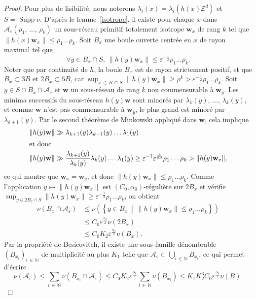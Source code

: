 \documentclass[AHL,Unicode,longabstracts,francais,published]{cedram}
\DeclareMathOperator{\Supp}{Supp}
\newcommand{\norm}[1]{\lVert#1\rVert}
\newcommand{\Z}{\mathbb{Z}}
\newcommand{\N}{\mathbb{N}}
\newcommand{\bw}{\mathbf{w}}
\newcommand{\cA}{\mathcal{A}}
\newcommand{\eps}{\varepsilon}
\let\oldforall\forall
\renewcommand*{\forall}{\mathrel{\oldforall}}
\begin{document}
\begin{proof}
Pour plus de lisibilité, nous noterons $\lambda_i(x)=\lambda_i(h(x)\Z^d)$ et $S=\Supp\nu$. D'après le lemme~\ref{isotrope}, il existe pour chaque $x$ dans $\cA_\eps(\rho_1,\,\dots,\,\rho_k)$ un sous-réseau primitif totalement isotrope $\bw_x$ de rang $k$ tel que $\|h(x)\bw_x\|\leq\rho_1\dots\rho_k$. Soit $B_x$ une boule ouverte centrée en $x$ de rayon maximal tel que
\[
\forall y\in B_x\cap S,\ \left\|h(y)\bw_x\right\| \leq \eps^{-\frac{1}{2}}\rho_1\dots\rho_k.
\]
Noter que par continuité de $h$, la boule $B_x$ est de rayon strictement positif, et que $B_x\subset 3B$ et $2B_x\subset 5B$, car $\sup_{x\,\in\,B\,\cap\,S}\|h(y)\bw_x\|\geq\rho^k>\eps^{-\frac{1}{2}}\rho_1\dots\rho_k$. Soit $y\in S\cap B_x \cap\cA_\eps$ et $\bw$ un sous-réseau de rang $k$ non commensurable à $\bw_y$. Les minima successifs du sous-réseau $h(y)\bw$ sont minorés par $\lambda_1(y),\,\dots,\,\lambda_k(y)$, et comme $\bw$ n'est pas commensurable à $\bw_y$, le plus grand est minoré par $\lambda_{k+1}(y)$. Par le second théorème de Minkowski appliqué dans $\bw$, cela implique
\begin{align*}
\norm{h(y)\bw} &\gg \lambda_{k+1}(y)\lambda_{k-1}(y)\dots\lambda_1(y)
\\
\intertext{et donc}
\left\|h(y)\bw\right\| &\gg \frac{\lambda_{k+1}(y)}{\lambda_k(y)}\lambda_k(y)\dots\lambda_1(y)
\geq \eps^{-1}\eps^{\frac{k}{2d}}\rho_1\dots\rho_k > \|h(y)\bw_x\|,
\end{align*}
ce qui montre que $\bw_x=\bw_y$, et donc $\|h(y)\bw_x\|\leq\rho_1\dots\rho_k$. Comme l'application $y\mapsto\|h(y)\bw_x\|$ est $(C_0,\alpha_0)$-régulière sur $2B_x$ et vérifie $\sup_{y\in 2B_x\cap S}\|h(y)\bw_x\|\geq\eps^{-\frac{1}{2}}\rho_1\dots\rho_k$, on obtient
\begin{align*}
\nu\left(B_x\cap\cA_\eps\right) & \leq \nu\left(\left\{y\in B_x \ \middle|\ \left\|h(y)\bw_x\right\|\leq\rho_1\dots\rho_k\right\}\right)\\
& \leq C_0 \eps^{\frac{\alpha_0}{2}}\nu(2B_x)\\
& \leq C_0K_2 \eps^{\frac{\alpha_0}{2}}\nu(B_x).
\end{align*}
Par la propriété de Besicovitch, il existe une sous-famille dénombrable $(B_{x_i})_{i\,\in\,\N}$ de multiplicité au plus $K_1$ telle que $\cA_\eps\subset\bigcup_{i\,\in\,\N}B_{x_i}$, ce qui permet d'écrire
\[
\nu\left(\cA_\eps\right) \leq \sum_{i\,\in\,\N} \nu\left(B_{x_i}\cap\cA_\eps\right)
\leq C_0K_2\eps^{\frac{\alpha_0}{2}} \sum_{i\,\in\,\N} \nu\left(B_{x_i}\right)
\leq K_1K_2^3C_0\eps^{\frac{\alpha_0}{2}}\nu(B).
\]
\end{proof}
\end{document}
